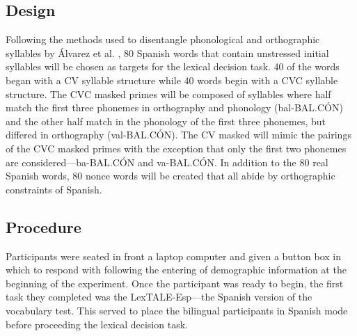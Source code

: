 \documentclass[
12pt, %
english, %
doublespacing, %
nolistspacing, %
liststotoc, %
headsepline, %
chapterinoneline, %
openany, %
]{DoctoralThesis}\usepackage[]{graphicx}\usepackage[]{color}
\begin{document}
\subsection{Design}

Following the methods used to disentangle phonological and orthographic syllables by Álvarez et al. \parencite*{Alvarez2004-nd}, 80 Spanish words that contain unstressed initial syllables will be chosen as targets for the lexical decision task. 40 of the words began with a CV syllable structure while 40 words begin with a CVC syllable structure. The CVC masked primes will be composed of syllables where half match the first three phonemes in orthography and phonology (bal-BAL.CÓN) and the other half match in the phonology of the first three phonemes, but differed in orthography (val-BAL.CÓN). The CV masked will mimic the pairings of the CVC masked primes with the exception that only the first two phonemes are considered—ba-BAL.CÓN and va-BAL.CÓN. In addition to the 80 real Spanish words, 80 nonce words will be created that all abide by orthographic constraints of Spanish.




\subsection{Procedure}

Participants were seated in front a laptop computer and given a button box in which to respond with following the entering of demographic information at the beginning of the experiment. Once the participant was ready to begin, the first task they completed was the LexTALE-Esp---the Spanish version of the vocabulary test. This served to place the bilingual participants in Spanish mode before proceeding the lexical decision task.
\end{document}
